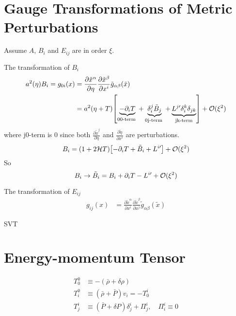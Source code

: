\documentclass{ctexart}
\begin{document}
\section{Gauge Transformations of Metric Perturbations}

Assume $A$, $B_i$ and $E_{ij}$ are in order $\xi$.

\begin{example}{The transformation of $B_i$}
    \begin{equation}
        \begin{aligned}
            a^2(\eta) B_i = g_{0i}(x) &= \frac{\partial \tilde{x}^\alpha}{\partial \eta} \frac{\partial \tilde{x}^\beta}{\partial x^i} \tilde{g}_{\alpha \beta} (\tilde{x}) \\ 
            &= a^2(\eta+T) \qty[\underbrace{-\partial_i T}_{\text {00-term }} + \underbrace{\delta^j_i  \tilde{B}_{j}}_{\text {0j-term }} + \underbrace{L^{j \prime} \delta^k_i \delta_{jk}}_{\text{jk-term}}] + \mathcal{O}(\xi^2) 
        \end{aligned}
    \end{equation}
    where j0-term is $0$ since both $\frac{\partial \tilde{x}^j}{\partial \eta}$ and $\frac{\partial \tilde{\eta}}{\partial x^i}$ are perturbations.
    \begin{equation}
        B_i = (1 + 2 \mathcal{H} T) \qty[-\partial_i T + \tilde{B}_{i} + L^{i \prime}] + \mathcal{O}(\xi^2) 
    \end{equation}
    So 
    \begin{equation}
        B_i \rightarrow \tilde{B}_{i} = B_i + \partial_i T - L^{i\prime} + \mathcal{O}(\xi^2) 
    \end{equation}
\end{example}

\begin{example}{The transformation of $E_{ij}$}
    \begin{equation}
        \begin{aligned}
            g_{ij}(x) &= \frac{\partial \tilde{x}^\alpha}{\partial x^i} \frac{\partial \tilde{x}^\beta}{\partial x^j} \tilde{g}_{\alpha \beta} (\tilde{x}) 
        \end{aligned}
    \end{equation}
    
\end{example}
\begin{exercise}{6.1}
    SVT    

\end{exercise}

\section{Energy-momentum Tensor}
\begin{equation}
    \begin{aligned}
    T_0^0 & \equiv-(\bar{\rho}+\delta \rho) \\
    T_i^0 & \equiv(\bar{\rho}+\bar{P}) v_i=-T_0^i \\
    T_j^i & \equiv(\bar{P}+\delta P) \delta_j^i+\Pi_j^i, \quad \Pi_i^i \equiv 0
    \end{aligned}
\end{equation}
\end{document}
